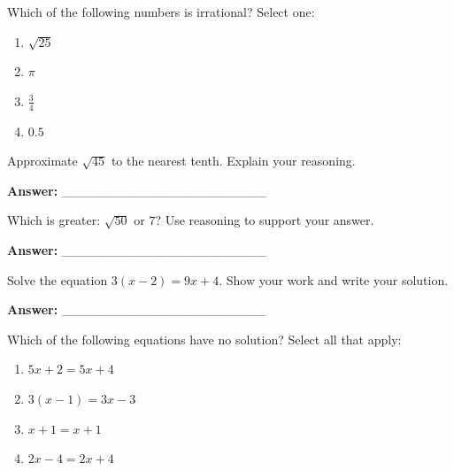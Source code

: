 \documentclass[12pt]{article}
\begin{document}
\begin{tcolorbox}[colframe=black!50, colback=white, title=\textbf{Problem 4 (8.NS.A.1)}]
Which of the following numbers is irrational? Select one:

\begin{enumerate}[label=(\Alph*)]
    \item \( \sqrt{25} \)
    \item \( \pi \)
    \item \( \frac{3}{4} \)
    \item \( 0.5 \)
\end{enumerate}
\end{tcolorbox}

\begin{tcolorbox}[colframe=black!50, colback=white, title=\textbf{Problem 5 (8.NS.A.2)}]
Approximate \(\sqrt{45}\) to the nearest tenth. Explain your reasoning.

\vspace{2cm}
\textbf{Answer:} \_\_\_\_\_\_\_\_\_\_\_\_\_\_\_\_\_\_\_\_\_\_
\end{tcolorbox}

\begin{tcolorbox}[colframe=black!50, colback=white, title=\textbf{Problem 6 (8.NS.A.2)}]
Which is greater: \( \sqrt{50} \) or \( 7 \)? Use reasoning to support your answer.

\vspace{1.75cm}
\textbf{Answer:} \_\_\_\_\_\_\_\_\_\_\_\_\_\_\_\_\_\_\_\_\_\_
\end{tcolorbox}

\begin{tcolorbox}[colframe=black!50, colback=white, title=\textbf{Problem 7 (8.EE.C.7)}]
Solve the equation \(3(x - 2) = 9x + 4\). Show your work and write your solution.

\vspace{2cm}
\textbf{Answer:} \_\_\_\_\_\_\_\_\_\_\_\_\_\_\_\_\_\_\_\_\_\_
\end{tcolorbox}

\begin{tcolorbox}[colframe=black!50, colback=white, title=\textbf{Problem 8 (8.EE.C.7)}]
Which of the following equations have no solution? Select all that apply:

\begin{enumerate}[label=(\Alph*)]
    \item \(5x + 2 = 5x + 4\)
    \item \(3(x - 1) = 3x - 3\)
    \item \(x + 1 = x + 1\)
    \item \(2x - 4 = 2x + 4\)
\end{enumerate}
\end{tcolorbox}
\end{document}
